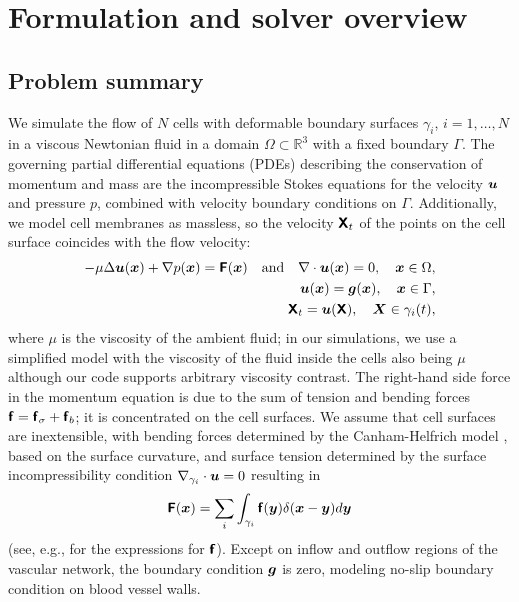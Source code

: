 
\section{Formulation and solver overview\label{sec:formulation}}

\subsection{Problem summary}


We simulate the flow of $N$ cells with deformable boundary surfaces
$\gamma_i$, $i=1,\ldots,N$ in a viscous Newtonian fluid in a domain
$\Omega\subset\mathbb R^3$ with a fixed boundary $\Gamma$. The governing
partial differential equations (PDEs) describing the conservation of
momentum and mass are the incompressible Stokes equations for the
velocity ${\bm{u}}$ and pressure $p$, combined with velocity boundary
conditions on $\Gamma$.  Additionally, we model cell membranes as massless, so the
velocity $\bm{\mathsf{X}}_t$ of
the points on the cell surface  coincides with the flow velocity:
%
\begin{align}
  -\mu \Delta {\bm{u}}({\bm{x}}) + \nabla p({\bm{x}}) = \bm{\mathsf{F}}({\bm{x}}) \quad \mathrm{and}\quad \nabla \cdot {\bm{u}}({\bm{x}}) = 0, \quad {\bm{x}} \in \Omega, 
  \label{eq:stokes_diff1} \\
  {\bm{u}}({\bm{x}}) = \bm{g}({\bm{x}}), \quad {\bm{x}} \in \Gamma,
  \label{eq:stokes_diff2}  \\
  \bm{\mathsf{X}}_t = {\bm{u}}(\bm{\mathsf{X}}), \quad {\bm{X}} \in \gamma_i(t),
  \label{eq:stokes_diff3}  
\end{align}
where $\mu$ is the viscosity of the ambient fluid; in our simulations, we use a simplified model with
the viscosity of the fluid inside the cells also being $\mu$ although
our code supports arbitrary viscosity contrast.  The right-hand side
force in the momentum equation is due to the sum of tension and
bending forces $\bm{\mathsf{f}} = \bm{\mathsf{f}}_\sigma + \bm{\mathsf{f}}_b$; it is concentrated on
the cell surfaces. We assume that cell surfaces are  inextensible,
with bending forces determined by the Canham-Helfrich model \cite{canham1970minimum, helfrich1973elastic},
 based on the surface curvature, and surface tension determined by the surface
incompressibility condition $\nabla_{\gamma_i} \cdot{\bm{u}} = 0$ resulting in
\[
\bm{\mathsf{F}}({\bm{x}}) = \sum_i \int_{\gamma_i} \bm{\mathsf{f}}({\bm{y}}) \delta({\bm{x}} - {\bm{y}})d{\bm{y}} 
\]
(see, e.g., \cite{rahimian2015} for the expressions for $\bm{\mathsf{f}}$).
Except on inflow and outflow regions of the vascular network, the boundary condition $\bm{g}$ is zero, modeling no-slip boundary condition on blood vessel walls.

